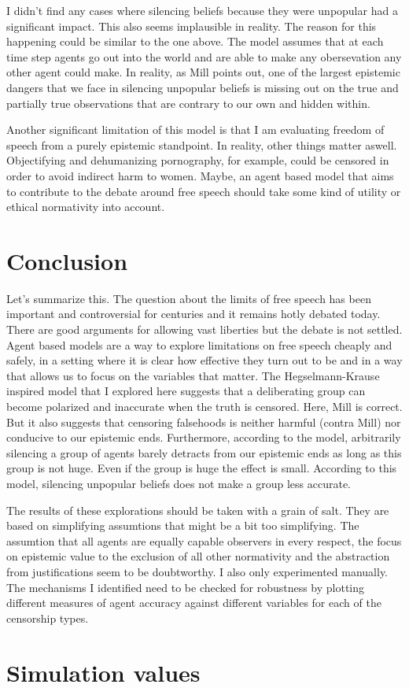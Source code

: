 \documentclass{essay-formal}
\begin{document}
I didn't find any cases where silencing beliefs because they were unpopular had a significant impact. This also seems implausible in reality. The reason for this happening could be similar to the one above. The model assumes that at each time step agents go out into the world and are able to make any obersevation any other agent could make. In reality, as Mill points out, one of the largest epistemic dangers that we face in silencing unpopular beliefs is missing out on the true and partially true observations that are contrary to our own and hidden within.

Another significant limitation of this model is that I am evaluating freedom of speech from a purely epistemic standpoint. In reality, other things matter aswell. Objectifying and dehumanizing pornography, for example, could be censored in order to avoid indirect harm to women. Maybe, an agent based model that aims to contribute to the debate around free speech should take some kind of utility or ethical normativity into account.

\section{Conclusion}

Let's summarize this. The question about the limits of free speech has been important and controversial for centuries and it remains hotly debated today. There are good arguments for allowing vast liberties but the debate is not settled. Agent based models are a way to explore limitations on free speech cheaply and safely, in a setting where it is clear how effective they turn out to be and in a way that allows us to focus on the variables that matter. The Hegselmann-Krause inspired model that I explored here suggests that a deliberating group can become polarized and inaccurate when the truth is censored. Here, Mill is correct. But it also suggests that censoring falsehoods is neither harmful (contra Mill) nor conducive to our epistemic ends. Furthermore, according to the model, arbitrarily silencing a group of agents barely detracts from our epistemic ends as long as this group is not huge. Even if the group is huge the effect is small. According to this model, silencing unpopular beliefs does not make a group less accurate.

The results of these explorations should be taken with a grain of salt. They are based on simplifying assumtions that might be a bit too simplifying. The assumtion that all agents are equally capable observers in every respect, the focus on epistemic value to the exclusion of all other normativity and the abstraction from justifications seem to be doubtworthy. I also only experimented manually. The mechanisms I identified need to be checked for robustness by plotting different measures of agent accuracy against different variables for each of the censorship types.

\clearpage
\appendix

\section{Simulation values}

\nocite{schieb2016}
\nocite{onuchowska2019}
\clearpage
\printbibliography

\end{document}
